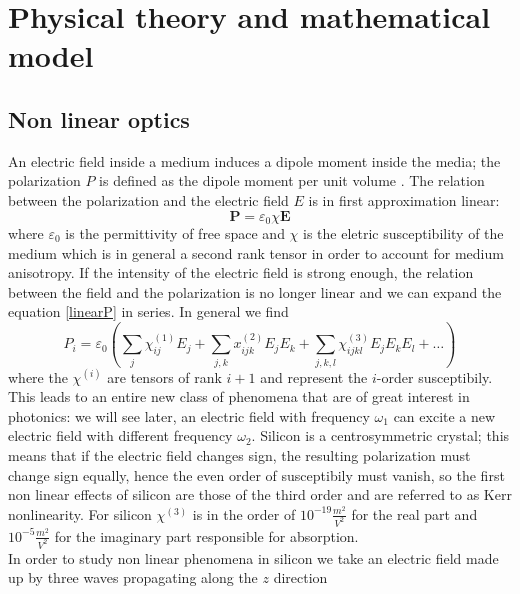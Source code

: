 \documentclass[12pt]{book}
\begin{document}

\tableofcontents




\chapter{Physical theory and mathematical model}
\section{Non linear optics}
An electric field inside a medium induces a dipole moment inside the media; the polarization $P$ is defined as the dipole moment per unit volume \cite{book:saleh}. The relation between the polarization and the electric field $E$ is in first approximation linear:
\begin{equation}\label{linearP} \mathbf{P} = \varepsilon_0 \chi \mathbf{E}
\end{equation}
where $\varepsilon_0$ is the permittivity of free space and $\chi$ is the eletric susceptibility of the medium which is in general a second rank tensor in order to account for medium anisotropy. If the intensity of the electric field is strong enough, the relation between the field and the polarization is no longer linear and we can expand the equation \eqref{linearP} in series. In general we find
\begin{equation}\label{nonlinearpolarization}P_i  = \varepsilon_0(\sum_j \chi_{ij}^{(1)} E_j + \sum_{j,k}x_{ijk}^{(2)}E_jE_k + \sum_{j,k,l}\chi_{ijkl}^{(3)}E_jE_kE_l + \dots )\end{equation}
where the $\chi^{(i)}$ are tensors of rank $i+1$ and represent the $i$-order susceptibily. This leads to an entire new class of phenomena that are of great interest in photonics: we will see later, an electric field with frequency $\omega_1$ can excite a new electric field with different frequency $\omega_2$. Silicon is a centrosymmetric crystal; this means that if the electric field changes sign, the resulting polarization must change sign equally, hence the even order of susceptibily must vanish, so the first non linear effects of silicon are those of the third order and are referred to as Kerr nonlinearity. For silicon $\chi^{(3)}$ is in the order of $10^{-19} \frac{m^2}{V^2}$ for the real part and $10^{-5} \frac{m^2}{V^2}$ for the imaginary part responsible for absorption. \\
In order to study non linear phenomena in silicon we take an electric field made up by three waves propagating along the $z$ direction
\end{document}
